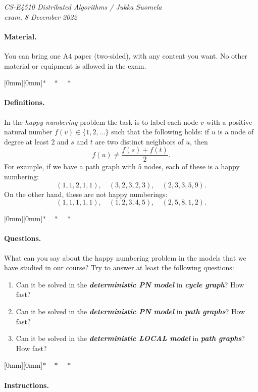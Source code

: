 \documentclass[12pt,a4paper]{article}
\newcommand{\sep}{{\centering \raisebox{-3mm}[0mm][0mm]{$*\quad*\quad*$}\par}}
\newcommand{\cemph}[1]{\textbf{\emph{\boldmath #1}}}
\begin{document}
\noindent
\emph{CS-E4510 Distributed Algorithms / Jukka Suomela\\
exam, 8 December 2022}

\paragraph{Material.}

You can bring one A4 paper (two-sided), with any content you want. No other material or equipment is allowed in the exam.

\sep

\paragraph{Definitions.}

In the \emph{happy numbering} problem the task is to label each node $v$ with a positive natural number $f(v) \in \{1,2,\dotsc\}$ such that the following holds: if $u$ is a node of degree at least $2$ and $s$ and $t$ are two distinct neighbors of $u$, then
\[
    f(u) \ne \frac{f(s) + f(t)}{2}.
\]
For example, if we have a path graph with $5$ nodes, each of these is a happy numbering:
\[
    (1,1,2,1,1), \quad
    (3,2,3,2,3), \quad
    (2,3,3,5,9).
\]
On the other hand, these are not happy numberings:
\[
    (1,1,1,1,1), \quad
    (1,2,3,4,5), \quad
    (2,5,8,1,2).
\]

\sep

\paragraph{Questions.}

What can you say about the happy numbering problem in the models that we have studied in our course? Try to answer at least the following questions:
\begin{enumerate}
    \item Can it be solved in the \cemph{deterministic PN model} in \cemph{cycle graph}? How fast?
    \item Can it be solved in the \cemph{deterministic PN model} in \cemph{path graphs}? How fast?
    \item Can it be solved in the \cemph{deterministic LOCAL model} in \cemph{path graphs}? How fast?
\end{enumerate}

\sep

\paragraph{Instructions.}
\end{document}
